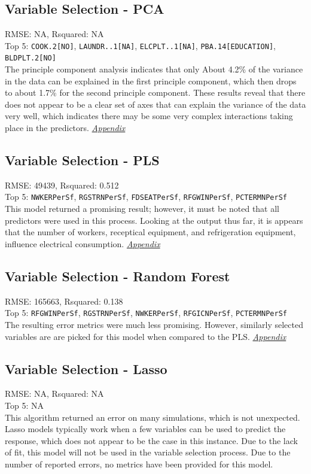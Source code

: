\subsection{Variable Selection - PCA}
RMSE: NA, Rsquared: NA\\
Top 5: \lstinline{COOK.2[NO]}, \lstinline{LAUNDR..1[NA]}, \lstinline{ELCPLT..1[NA]}, \lstinline{PBA.14[EDUCATION]}, \lstinline{BLDPLT.2[NO]}
\\[0.1in]
\indent The principle component analysis indicates that only About 4.2\% of the variance in the data can be explained in the first principle component, which then drops to about 1.7\% for the second principle component.  These results reveal that there does not appear to be a clear set of axes that can explain the variance of the data very well, which indicates there may be some very complex interactions taking place in the predictors.  \textit{\hyperref[appendix:electricity:pca]{Appendix}}

\subsection{Variable Selection - PLS}
RMSE: 49439, Rsquared: 0.512\\
Top 5: \lstinline{NWKERPerSf}, \lstinline{RGSTRNPerSf}, \lstinline{FDSEATPerSf}, \lstinline{RFGWINPerSf}, \lstinline{PCTERMNPerSf}
\\[0.1in]
\indent This model returned a promising result; however, it must be noted that all predictors were used in this process.  Looking at the output thus far, it is appears that the number of workers, receptical equipment, and refrigeration equipment, influence electrical consumption.  \textit{\hyperref[appendix:electricity:pls]{Appendix}}

\subsection{Variable Selection - Random Forest}
RMSE: 165663, Rsquared: 0.138\\
Top 5: \lstinline{RFGWINPerSf}, \lstinline{RGSTRNPerSf}, \lstinline{NWKERPerSf}, \lstinline{RFGICNPerSf},  \lstinline{PCTERMNPerSf}
\\[0.1in]
\indent The resulting error metrics were much less promising.  However, similarly selected variables are are picked for this model when compared to the PLS.  \textit{\hyperref[appendix:electricity:rf]{Appendix}}

\subsection{Variable Selection - Lasso}
RMSE: NA, Rsquared: NA\\
 Top 5: NA
\\[0.1in]
\indent This algorithm returned an error on many simulations, which is not unexpected.  Lasso models typically work when a few variables can be used to predict the response, which does not appear to be the case in this instance.  Due to the lack of fit, this model will not be used in the variable selection process.  Due to the number of reported errors, no metrics have been provided for this model.

